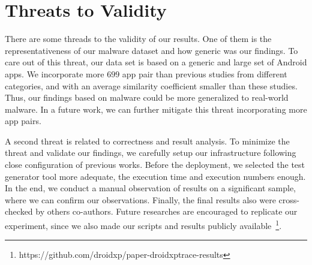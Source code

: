 \section{Threats to Validity}\label{sec:threats}


There are some threads to the validity of our results. One of them is the representativeness of our malware dataset and how generic was our findings. To care out of this threat, our data set is based on a generic and large set of Android apps. We incorporate more $699$ app pair than previous studies from different categories, and with an average similarity coefficient smaller than these studies. Thus, our findings based on malware could be more generalized to real-world malware. In a future work, we can further mitigate this threat incorporating more app pairs.

A second threat is related to correctness and result analysis. To minimize the threat and validate our findings, we carefully setup our infrastructure following close configuration of previous works. Before the deployment, we selected the test generator tool more adequate, the execution time and execution numbers enough. In the end, we conduct a manual observation of results on a significant sample, where we can confirm our observations. Finally, the final results also were cross-checked by others co-authors. Future researches are encouraged to replicate our experiment, since we also made our scripts and results publicly available~\footnote{ https://github.com/droidxp/paper-droidxptrace-results}.